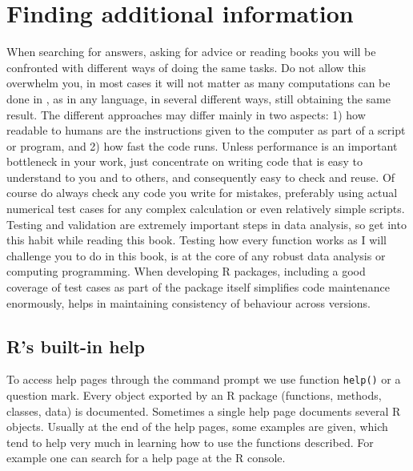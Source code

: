 \documentclass[krantz2,ChapterTOCs]{krantz}\usepackage{knitr}
\begin{document}
\section{Finding additional information}

When searching for answers, asking for advice or reading books you will be confronted with different ways of doing the same tasks. Do not allow this overwhelm you, in most cases it will not matter as many computations can be done in \Rpgrm, as in any language, in several different ways, still obtaining the same result. The different approaches may differ mainly in two aspects: 1) how readable to humans are the instructions given to the computer as part of a script or program, and 2) how fast the code runs. Unless performance is an important bottleneck in your work, just concentrate on writing code that is easy to understand to you and to others, and consequently easy to check and reuse. Of course do always check any code you write for mistakes, preferably using actual numerical test cases for any complex calculation or even relatively simple scripts. Testing and validation are extremely important steps in data analysis, so get into this habit while reading this book. Testing how every function works as I will challenge you to do in this book, is at the core of any robust data analysis or computing programming. When developing R packages, including a good coverage of test cases as part of the package itself simplifies code maintenance enormously, helps in maintaining consistency of behaviour across versions.

\subsection{R's built-in help}

To access help pages through the command prompt we use function \texttt{help()} or a question mark. Every object exported by an R package (functions, methods, classes, data) is documented. Sometimes a single help page documents several R objects. Usually at the end of the help pages, some examples are given, which tend to help very much in learning how to use the functions described. For example one can search for a help page at the R console.

\begin{knitrout}\footnotesize
{}\color{fgcolor}\begin{kframe}
\begin{alltt}
\hlstd{(}\hlstd{)}
\end{alltt}
\end{kframe}
\end{knitrout}
\end{document}
